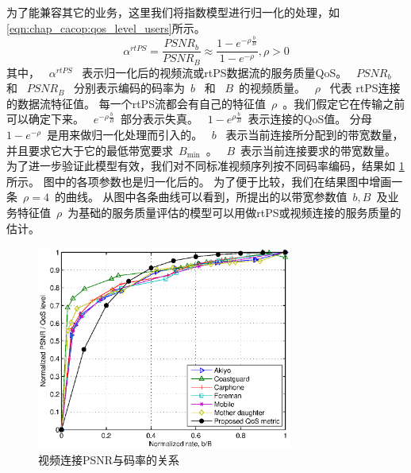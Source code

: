 \begin{enumerate}[(1)]
为了能兼容其它的业务，这里我们将指数模型进行归一化的处理，如
\eqref{eqn:chap_cacop:qos_level_users}所示。
\begin{equation}
\alpha^{rtPS} = \frac{PSNR_b}{PSNR_B} \approx \frac{1- e^{-\rho \frac{b}{B} }}{1-e^{-\rho}}, \rho > 0
\label{eqn:chap_cacop:qos_level_users}
\end{equation}
其中，
~$\alpha^{rtPS}$~ 表示归一化后的视频流或rtPS数据流的服务质量QoS。
~$PSNR_b$~ 和 ~$PSNR_B$~ 分别表示编码的码率为~$b$~ 和 ~$B$~的视频质量。
~$\rho$~ 代表 rtPS连接的数据流特征值。
每一个rtPS流都会有自己的特征值~$\rho$~。我们假定它在传输之前可以确定下来。
~$e^{-\rho \frac{b}{B}}$~部分表示失真。
~$1- e^{\rho \frac{b}{B}}$~表示连接的QoS值。
分母~$1-e^{-\rho}$~是用来做归一化处理而引入的。
~$b$~ 表示当前连接所分配到的带宽数量，并且要求它大于它的最低带宽要求~$B_{\min}$~。
~$B$~表示当前连接要求的带宽数量。
为了进一步验证此模型有效，我们对不同标准视频序列按不同码率编码，结果如 \ref{fig:chap_cacop:qos_rate_cac}所示。
图中的各项参数也是归一化后的。
为了便于比较，我们在结果图中增画一条~$\rho=4$~的曲线。
从图中各条曲线可以看到，所提出的以带宽参数值~$b,B$~及业务特征值~$\rho$~为基础的服务质量评估的模型可以用做rtPS或视频连接的服务质量的估计。
\begin{figure}[tb]
\begin{center}
\includegraphics[width=0.75\textwidth] {cacop_qos_rate_cac.eps}
\end{center}
\caption{视频连接PSNR与码率的关系} 
\label{fig:chap_cacop:qos_rate_cac}
\end{figure}


\end{enumerate}
